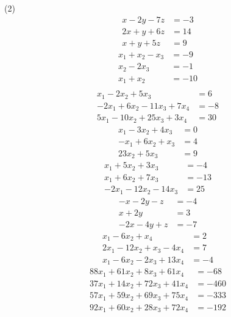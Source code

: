 \begin{tasks}[resume, style=enumerate](2)
\task
  \begin{align*}
    x - 2y - 7z &= -3 \\
    2x + y + 6z &= 14 \\
    x + y + 5z &= 9
  \end{align*}
\task
  \begin{align*}
    x_1 + x_2 - x_3 &= -9 \\
    x_2 - 2x_3 &= -1 \\
    x_1 + x_2 &= -10 \\
  \end{align*}
\task \faCalculator
  \begin{align*}
    x_1 - 2x_2 + 5x_3 &= 6 \\
    -2x_1 + 6x_2 - 11x_3 + 7x_4 &= -8 \\
    5x_1 - 10 x_2 + 25x_3 + 3x_4 &= 30
  \end{align*}
\task \faCalculator
  \begin{align*}
    x_1 - 3x_2 + 4x_3 &= 0 \\
    -x_1 + 6x_2 + x_3 &= 4 \\
    23x_2 + 5x_3 &= 9
  \end{align*}
\task \faCalculator
  \begin{align*}
    x_1 + 5x_2 + 3x_3 &= -4 \\
    x_1 + 6x_2 + 7x_3 &= -13 \\
    -2x_1 - 12 x_2 - 14 x_3 &= 25
  \end{align*}
\task
  \begin{align*}
    -x - 2y - z &= -4 \\
    x + 2y &= 3 \\
    -2x -4y + z &= -7
  \end{align*}
\task
  \begin{align*}
    x_{1} - 6x_{2} + x_{4} &= 2 \\
    2x_{1} - 12x_{2} + x_{3} - 4x_{4} &= 7 \\
    x_{1} - 6x_{2} - 2x_{3} + 13x_{4} &= -4
  \end{align*}
\task \faCalculator
  \begin{align*}
    88x_1 + 61x_2 + 8x_3 + 61 x_4 &= -68 \\
    37x_1 + 14x_2 + 72x_3 + 41 x_4 &= -460 \\
    57x_1 + 59x_2 + 69x_3 + 75x_4 &= -333 \\
    92 x_1 + 60x_2 + 28x_3 + 72x_4 &= -192
  \end{align*}

\end{tasks}
